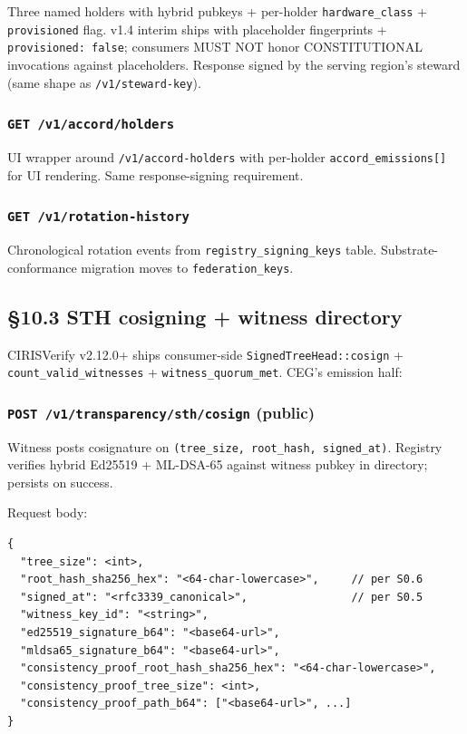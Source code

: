 \documentclass[10pt]{article}
\begin{document}
Three named holders with hybrid pubkeys + per-holder \texttt{hardware\_class} + \texttt{provisioned} flag. v1.4 interim ships with placeholder fingerprints + \texttt{provisioned: false}; consumers MUST NOT honor CONSTITUTIONAL invocations against placeholders. Response signed by the serving region's steward (same shape as \texttt{/v1/steward-key}).


\subsubsection*{\texttt{GET /v1/accord/holders}}


UI wrapper around \texttt{/v1/accord-holders} with per-holder \texttt{accord\_emissions[]} for UI rendering. Same response-signing requirement.


\subsubsection*{\texttt{GET /v1/rotation-history}}


Chronological rotation events from \texttt{registry\_signing\_keys} table. Substrate-conformance migration moves to \texttt{federation\_keys}.


\subsection*{§10.3 STH cosigning + witness directory}


CIRISVerify v2.12.0+ ships consumer-side \texttt{SignedTreeHead::cosign} + \texttt{count\_valid\_witnesses} + \texttt{witness\_quorum\_met}. CEG's emission half:


\subsubsection*{\texttt{POST /v1/transparency/sth/cosign} (public)}


Witness posts cosignature on \texttt{(tree\_size, root\_hash, signed\_at)}. Registry verifies hybrid Ed25519 + ML-DSA-65 against witness pubkey in directory; persists on success.


Request body:


\begin{lstlisting}
{
  "tree_size": <int>,
  "root_hash_sha256_hex": "<64-char-lowercase>",     // per S0.6
  "signed_at": "<rfc3339_canonical>",                // per S0.5
  "witness_key_id": "<string>",
  "ed25519_signature_b64": "<base64-url>",
  "mldsa65_signature_b64": "<base64-url>",
  "consistency_proof_root_hash_sha256_hex": "<64-char-lowercase>",
  "consistency_proof_tree_size": <int>,
  "consistency_proof_path_b64": ["<base64-url>", ...]
}
\end{lstlisting}
\end{document}
